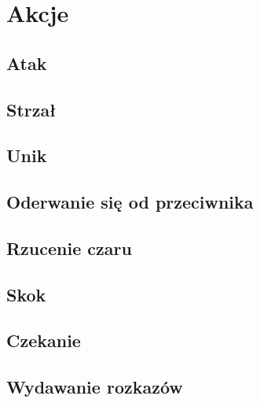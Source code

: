 \chapter{Akcje}

\section{Atak}

\section{Strzał}

\section{Unik}

\section{Oderwanie się od przeciwnika}

\section{Rzucenie czaru}

\section{Skok}

\section{Czekanie}

\section{Wydawanie rozkazów}

